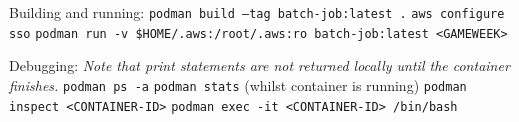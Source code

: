 Building and running:\newline
\texttt{podman build --tag batch-job:latest .}\newline
\texttt{aws configure sso}\newline
\texttt{podman run  -v \$HOME/.aws:/root/.aws:ro batch-job:latest <GAMEWEEK>}

Debugging:\newline
\textit{Note that print statements are not returned locally until the container finishes.}\newline
\texttt{podman ps -a}\newline
\texttt{podman stats} (whilst container is running)\newline
\texttt{podman inspect <CONTAINER-ID>}\newline
\texttt{podman exec -it <CONTAINER-ID> /bin/bash}\newline

\newpage
